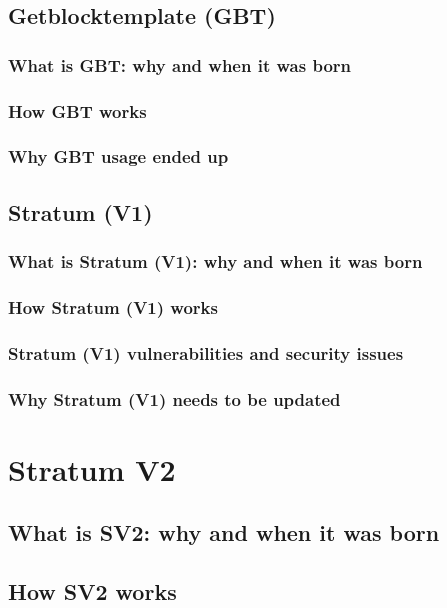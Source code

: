 \documentclass[a4paper,12pt,twoside,english]{toptesi}
\begin{document}
\section{Getblocktemplate (GBT)}
\subsection{What is GBT: why and when it was born}

\subsection{How GBT works}

\subsection{Why GBT usage ended up}

\newpage
\section{Stratum (V1)}\label{section:stratum}
\subsection{What is Stratum (V1): why and when it was born}

\subsection{How Stratum (V1) works}

\newpage
\subsection{Stratum (V1) vulnerabilities and security issues}

\newpage
\subsection{Why Stratum (V1) needs to be updated}

\chapter{Stratum V2}
\section{What is SV2: why and when it was born}

\newpage
\section{How SV2 works}

\newpage
\end{document}
